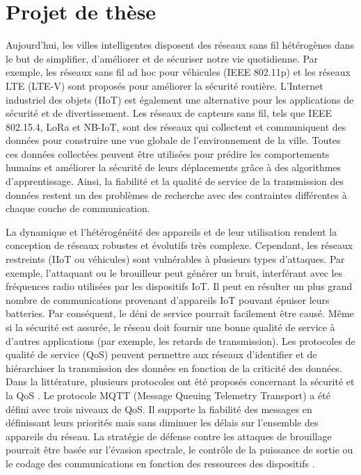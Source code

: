 \section{Projet de thèse}

Aujourd'hui,
	les villes intelligentes disposent des réseaux sans fil hétérogènes dans le but de simplifier,
	d'améliorer et de sécuriser notre vie quotidienne.
Par exemple,
	les réseaux sans fil ad hoc pour véhicules (IEEE 802.11p) et les réseaux LTE (LTE-V) sont proposés pour améliorer la sécurité routière.
L'Internet industriel des objets (IIoT) est également une alternative pour les applications de sécurité et de divertissement.
Les réseaux de capteurs sans fil,
	tels que IEEE 802.15.4,
	LoRa et NB-IoT,
	sont des réseaux qui collectent et communiquent des données pour construire une vue globale de l'environnement de la ville.
Toutes ces données collectées peuvent être utilisées pour prédire les comportements humains et améliorer la sécurité de leurs déplacements grâce à des algorithmes d'apprentissage.
Ainsi,
	la fiabilité et la qualité de service de la transmission des données restent un des problèmes de recherche avec des contraintes différentes à chaque couche de communication.

La dynamique et l'hétérogénéité des appareils et de leur utilisation rendent la conception de réseaux robustes et évolutifs très complexe.
Cependant,
	les réseaux restreints (IIoT ou véhicules) sont vulnérables à plusieurs types d'attaques.
Par exemple,
	l'attaquant ou le brouilleur peut générer un bruit,
	interférant avec les fréquences radio utilisées par les dispositifs IoT.
Il peut en résulter un plus grand nombre de communications provenant d'appareils IoT pouvant épuiser leurs batteries.
Par conséquent,
	le déni de service pourrait facilement être causé.
Même si la sécurité est assurée,
	le réseau doit fournir une bonne qualité de service à d'autres applications (par exemple,
	les retards de transmission).
Les protocoles de qualité de service (QoS) peuvent permettre aux réseaux d'identifier et de hiérarchiser la transmission des données en fonction de la criticité des données.
Dans la littérature,
	plusieurs protocoles ont été proposés concernant la sécurité et la QoS \cite{simiscuka_relay_2018}.
Le protocole MQTT (Message Queuing Telemetry Transport) a été défini avec trois niveaux de QoS.
Il supporte la fiabilité des messages en définissant leurs priorités mais sans diminuer les délais sur l'ensemble des appareils du réseau.
La stratégie de défense contre les attaques de brouillage pourrait être basée sur l'évasion spectrale,
	le contrôle de la puissance de sortie ou le codage des communications en fonction des ressources des dispositifs \cite{xu_jamming_2006}\cite{stellios_survey_2018}.

